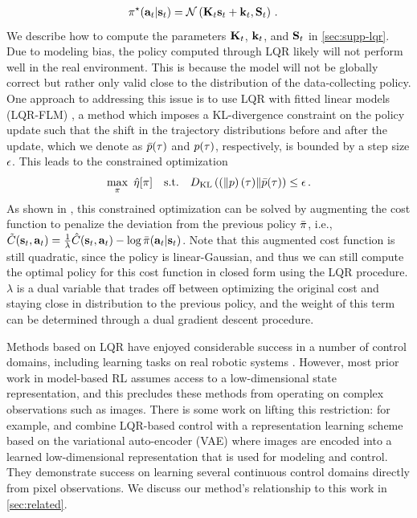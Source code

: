 \begin{align*}
    &\pi^\star(\mathbf{a}_t|\mathbf{s}_t)=\mathcal{N}\left(\mathbf{K}_t\mathbf{s}_t+\mathbf{k}_t,\mathbf{S}_t\right)\,.
\end{align*}
We describe how to compute the parameters $\mathbf{K}_t$, $\mathbf{k}_t$, and $\mathbf{S}_t$ in \autoref{sec:supp-lqr}. Due to modeling bias, the policy computed through LQR likely will not perform well in the real environment. This is because the model will not be globally correct but rather only valid close to the distribution of the data-collecting policy. One approach to addressing this issue is to use LQR with fitted linear models \mbox{(LQR-FLM)} \citep{mfcgps}, a method which imposes a KL-divergence constraint on the policy update such that the shift in the trajectory distributions before and after the update, which we denote as $\bar{p}(\tau)$ and $p(\tau)$, respectively, is bounded by a step size $\epsilon$. This leads to the constrained optimization
\begin{align}
    \max_\policy~\hat{\policyobj}[\policy]\text{\ \ \ s.t.\ \ \ }D_\KL(p(\traj)\|\bar{p}(\traj))\leq\polstepsize\,.\label{eq:lqrflm}
\end{align}
As shown in \citet{mfcgps}, this constrained optimization can be solved by augmenting the cost function to penalize the deviation from the previous policy $\bar{\pi}$, i.e., $\tilde{C}(\mathbf{s}_t,\mathbf{a}_t)=\frac{1}{\lambda}\hat{C}(\mathbf{s}_t,\mathbf{a}_t)-\log\bar{\pi}(\mathbf{a}_t|\mathbf{s}_t)$. Note that this augmented cost function is still quadratic, since the policy is linear-Gaussian, and thus we can still compute the optimal policy for this cost function in closed form using the LQR procedure. $\lambda$ is a dual variable that trades off between optimizing the original cost and staying close in distribution to the previous policy, and the weight of this term can be determined through a dual gradient descent procedure.

Methods based on LQR have enjoyed considerable success in a number of control domains, including learning tasks on real robotic systems \citep{ilqg,gps}. However, most prior work in model-based RL assumes access to a low-dimensional state representation, and this precludes these methods from operating on complex observations such as images. There is some work on lifting this restriction: for example, \citet{e2c} and \citet{rce} combine LQR-based control with a representation learning scheme based on the variational auto-encoder (VAE) \citep{Kingma2014, Rezende2014} where images are encoded into a learned low-dimensional representation that is used for modeling and control. They demonstrate success on learning several continuous control domains directly from pixel observations. We discuss our method's relationship to this work in \autoref{sec:related}.


